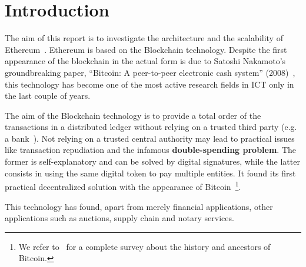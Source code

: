 \section{Introduction}

The aim of this report is to investigate the architecture and the scalability of
Ethereum~\cite{wood2018ethereum}. Ethereum is based on the Blockchain
technology. Despite the first appearance of the blockchain in the actual form is
due to Satoshi Nakamoto's groundbreaking paper, ``Bitcoin: A peer-to-peer
electronic cash system'' (2008)~\cite{bib:bitcoin}, this technology has become
one of the most active research fields in ICT only in the last couple of years.

The aim of the Blockchain technology is to provide a total order of the
transactions in a distributed ledger without relying on a trusted third party
(e.g. a bank~\cite{bib:the-quest}). Not relying on a trusted central authority
may lead to practical issues like transaction repudiation and the infamous
\textbf{double-spending problem}. The former is self-explanatory and can be
solved by digital signatures, while the latter consists in using the same
digital token to pay multiple entities. It found its first practical
decentralized solution with the appearance of
Bitcoin~\cite{ethereumwp}\footnote{We refer to~\cite{ethereumwp} for a complete
survey about the history and ancestors of Bitcoin.}.

This technology has found, apart from merely financial applications, other
applications such as auctions, supply chain and notary services.

